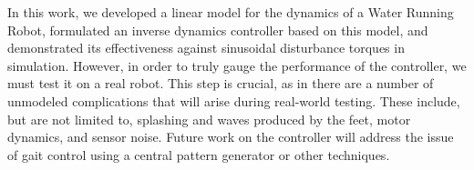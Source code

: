 In this work, we developed a linear model for the dynamics of a Water Running Robot, formulated an inverse dynamics controller based on this model, and demonstrated its effectiveness against sinusoidal disturbance torques in simulation. However, in order to truly gauge the performance of the controller, we must test it on a real robot. This step is crucial, as in there are a number of unmodeled complications that will arise during real-world testing. These include, but are not limited to, splashing and waves produced by the feet, motor dynamics, and sensor noise. Future work on the controller will address the issue of gait control using a central pattern generator or other techniques.
